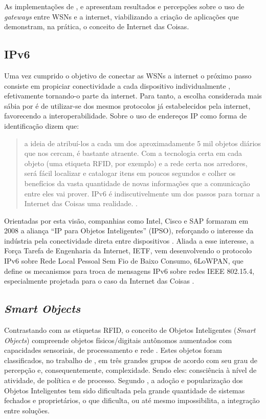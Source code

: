 \documentclass[twoside,english,brazilian]{UNISINOSmonografia}
\begin{document}
	As implementações de ,  e 
	 apresentam resultados e percepções sobre o uso de 
	\textit{gateways} entre WSNs e a internet, viabilizando a criação de 
	aplicações que demonstram, na prática, o conceito de Internet das Coisas.

\subsection{IPv6}
	Uma vez cumprido o objetivo de conectar as WSNs a internet o próximo passo 
	consiste em propiciar conectividade a cada dispositivo individualmente 
	\cite[p.~13]{Atzori2010b}, efetivamente tornando-o parte da internet.
	Para tanto, a escolha considerada mais sábia por  
	é de utilizar-se dos mesmos protocolos já estabelecidos pela internet, 
	favorecendo a interoperabilidade.
	Sobre o uso de endereços IP como forma de 
	identificação  dizem que:
	\begin{quote}
		a ideia de atribuí-los a cada um dos aproximadamente 5 
		mil objetos diários que nos cercam, é bastante atraente.
		Com a tecnologia certa em cada objeto (uma etiqueta RFID, por exemplo) 
		e a rede certa nos arredores, será fácil localizar e catalogar itens 
		em poucos segundos e colher os benefícios da vasta quantidade de novas 
		informações que a comunicação entre eles vai prover. IPv6 é 
		indiscutivelmente um dos passos para tornar a Internet das Coisas uma 
		realidade.
		\cite[p.~15]{Sundmaeker2010}.
	\end{quote}
	
	Orientadas por esta visão, companhias como Intel, Cisco e SAP formaram em 
	2008 a aliança ``IP para Objetos Inteligentes'' (IPSO), reforçando o 
	interesse da indústria pela conectividade direta entre dispositivos 
	\cite{Dunkels2008, Mattern2010a}. 
	Aliada a esse interesse, a Força Tarefa de Engenharia da Internet, IETF, 
	vem desenvolvendo o protocolo IPv6 sobre Rede Local Pessoal Sem Fio de 
	Baixo Consumo, 6LoWPAN, que define os mecanismos para troca de mensagens 
	IPv6 sobre redes IEEE 802.15.4, especialmente projetada para o caso da 
	Internet das Coisas \cite{Gomez2010}.

\subsection{\textit{Smart Objects}}
	Contrastando com as etiquetas RFID, o conceito de Objetos Inteligentes 
	(\textit{Smart Objects}) compreende objetos físicos/digitais autônomos 
	aumentados com capacidades sensoriais, de processamento e rede 
	\cite{Gellersen2001}.
	Estes objetos foram classificados, no trabalho de , em 
	três grandes grupos de acordo com seu grau de percepção e, 
	consequentemente, complexidade. Sendo eles: consciência à nível de 
	atividade, de política e de processo.
	Segundo , a adoção e popularização dos Objetos 
	Inteligentes tem sido dificultada pela grande quantidade de sistemas 
	fechados e proprietários, o que dificulta, ou até mesmo impossibilita, a 
	integração entre soluções. 
	
\end{document}

